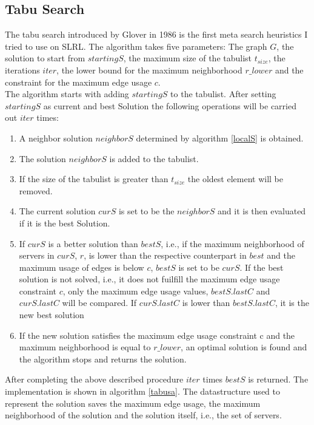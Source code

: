 \documentclass [12pt]{article}
\begin{document}
\subsection{Tabu Search}
The tabu search introduced by Glover in 1986 \cite{Glover:1986:FPI:15310.15311} is the first meta search heuristics I tried to use on SLRL.
The algorithm takes five parameters: The graph $G$, the solution
to start from $startingS$, the maximum size of the tabulist $t_{size}$, the iterations $iter$, the lower bound for the maximum neighborhood
$r\_lower$ and the constraint for the maximum edge usage $c$.\\
The algorithm starts with adding $startingS$ to the tabulist.  
After setting $startingS$ as current and best Solution the following operations will be carried out $iter$ times: 
\begin{enumerate}
  \item{A neighbor solution $neighborS$ determined by algorithm \ref{localS} is obtained.}
  \item{The solution $neighborS$ is added to the tabulist.}
  \item{If the size of the tabulist is greater than $t_{size}$ the oldest element will be removed.}
  \item{The current solution $curS$ is set to be the $neighborS$ and it is then evaluated if it is the best Solution.}
  \item{If $curS$ is a better solution than $bestS$, i.e., if the maximum neighborhood of servers in $curS$, $r$, is lower than the respective counterpart in 
   $best$ and the maximum usage of edges is below $c$, $bestS$ is set to be $curS$. If the best solution is not solved, i.e., it does not fuilfill the
  maximum edge usage constraint $c$, only the maximum edge usage values,
  $bestS.lastC$ and $curS.lastC$ will be compared. If $curS.lastC$ is lower than $bestS.lastC$, it is the new best solution}
  \item{If the new solution satisfies the maximum edge usage constraint c and the maximum neighborhood is equal to $r\_lower$, an optimal
  solution is found and the algorithm stops and returns the solution.}
\end{enumerate}
After completing the above described procedure $iter$ times $bestS$ is returned.
The implementation is shown in algorithm \ref{tabusa}. The datastructure used to represent the solution saves the maximum edge usage, the maximum neighborhood
of the solution and the solution itself, i.e., the set of servers. 
\end{document}
